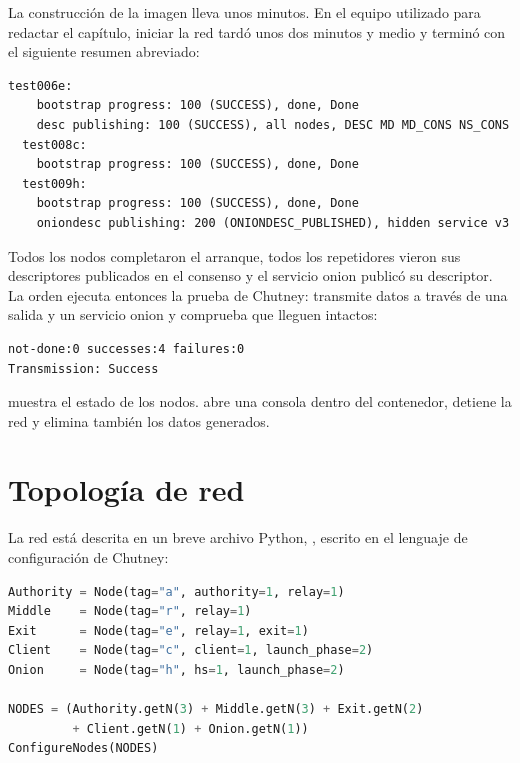 La construcción de la imagen lleva unos minutos. En el equipo utilizado para redactar el capítulo, iniciar la red tardó unos dos minutos y medio y terminó con el siguiente resumen abreviado:
\begin{lstlisting}[numbers=none]
  test006e:
    bootstrap progress: 100 (SUCCESS), done, Done
    desc publishing: 100 (SUCCESS), all nodes, DESC MD MD_CONS NS_CONS
  test008c:
    bootstrap progress: 100 (SUCCESS), done, Done
  test009h:
    bootstrap progress: 100 (SUCCESS), done, Done
    oniondesc publishing: 200 (ONIONDESC_PUBLISHED), hidden service v3
\end{lstlisting}

Todos los nodos completaron el arranque, todos los repetidores vieron sus descriptores publicados en el consenso y el servicio onion publicó su descriptor. La orden  ejecuta entonces la prueba de Chutney: transmite datos a través de una salida y un servicio onion y comprueba que lleguen intactos:
\begin{lstlisting}[numbers=none]
  not-done:0 successes:4 failures:0
Transmission: Success
\end{lstlisting}

 muestra el estado de los nodos.  abre una consola dentro del contenedor,  detiene la red y  elimina también los datos generados.

\section{Topología de red}\label{sec:rp-topologia}

La red está descrita en un breve archivo Python, , escrito en el lenguaje de configuración de Chutney:
\begin{lstlisting}[language=Python]
Authority = Node(tag="a", authority=1, relay=1)
Middle    = Node(tag="r", relay=1)
Exit      = Node(tag="e", relay=1, exit=1)
Client    = Node(tag="c", client=1, launch_phase=2)
Onion     = Node(tag="h", hs=1, launch_phase=2)

NODES = (Authority.getN(3) + Middle.getN(3) + Exit.getN(2)
         + Client.getN(1) + Onion.getN(1))
ConfigureNodes(NODES)
\end{lstlisting}

